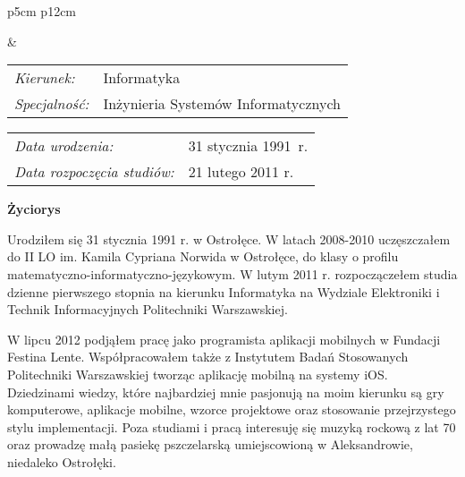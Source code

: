 \begin{titlepage}
    \newpage\thispagestyle{empty}
    \begin{tabular}{p{5cm} p{12cm}}
    \begin{minipage}{5cm}
    \center
    \end{minipage}
    &
    \begin{minipage}{12cm}
    \begin{flushleft}
    \par\noindent\vspace{1\baselineskip}
    \renewcommand{\arraystretch}{1.5}\begin{tabular}[h]{l l}
    {\normalsize\it Kierunek:} & Informatyka \\
    {\normalsize\it Specjalność:} & Inżynieria Systemów Informatycznych \\
    \end{tabular}
    \par\noindent\vspace{1\baselineskip}
    \renewcommand{\arraystretch}{1.5}\begin{tabular}[h]{l l}
    {\normalsize\it Data urodzenia:} & {\normalsize 31 stycznia 1991~r.} \\
    {\normalsize\it Data rozpoczęcia studiów:} & {\normalsize 21 lutego 2011 r.}
    \end{tabular}
    \par\noindent\vspace{1\baselineskip}
    \end{flushleft}
    \end{minipage}
    \end{tabular}
    \vspace*{1\baselineskip}
    \begin{center}
	{\large\bfseries Życiorys}\par\bigskip
    \end{center}

    \indent
    
\begin{small}
    Urodziłem się 31 stycznia 1991 r. w Ostrołęce. W latach 2008-2010 uczęszczałem do II LO im. Kamila Cypriana Norwida w Ostrołęce, do klasy o profilu matematyczno-informatyczno-językowym. W lutym 2011 r. rozpoczączełem studia dzienne pierwszego stopnia na kierunku Informatyka na Wydziale Elektroniki i Technik Informacyjnych Politechniki Warszawskiej. 
    
    W lipcu 2012 podjąłem pracę jako programista aplikacji mobilnych w Fundacji Festina Lente. Współpracowałem także z Instytutem Badań Stosowanych Politechniki Warszawskiej tworząc aplikację mobilną na systemy iOS. Dziedzinami wiedzy, które najbardziej mnie pasjonują na moim kierunku są gry komputerowe, aplikacje mobilne, wzorce projektowe oraz stosowanie przejrzystego stylu implementacji.
    Poza studiami i pracą interesuję się muzyką rockową z lat 70 oraz prowadzę małą pasiekę pszczelarską umiejscowioną w Aleksandrowie, niedaleko Ostrołęki.
\end{small}
    

\end{titlepage}
